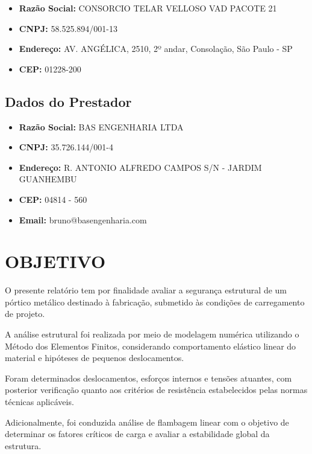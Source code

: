 \documentclass[12pt, a4paper]{article}
\begin{document}
\begin{itemize}
    \item \textbf{Razão Social:} CONSORCIO TELAR VELLOSO VAD PACOTE 21
     \item \textbf{CNPJ:} 58.525.894/001-13
     \item \textbf{Endereço:} AV. ANGÉLICA, 2510, 2º andar, Consolação, São Paulo - SP
     \item \textbf{CEP:} 01228-200\\
\end{itemize}

\subsection{Dados do Prestador}
\begin{itemize}
    \item \textbf{Razão Social:} BAS ENGENHARIA LTDA
    \item \textbf{CNPJ:} 35.726.144/001-4
    \item \textbf{Endereço:} R. ANTONIO ALFREDO CAMPOS S/N - JARDIM GUANHEMBU
    \item \textbf{CEP:} 04814 - 560
    \item \textbf{Email:} bruno@basengenharia.com\\
\end{itemize}

\newpage


\section{OBJETIVO}

O presente relatório tem por finalidade avaliar a segurança estrutural de um pórtico metálico destinado à fabricação, submetido às condições de carregamento de projeto.

A análise estrutural foi realizada por meio de modelagem numérica utilizando o Método dos Elementos Finitos, considerando comportamento elástico linear do material e hipóteses de pequenos deslocamentos.

Foram determinados deslocamentos, esforços internos e tensões atuantes, com posterior verificação quanto aos critérios de resistência estabelecidos pelas normas técnicas aplicáveis.

Adicionalmente, foi conduzida análise de flambagem linear com o objetivo de determinar os fatores críticos de carga e avaliar a estabilidade global da estrutura.
\end{document}
